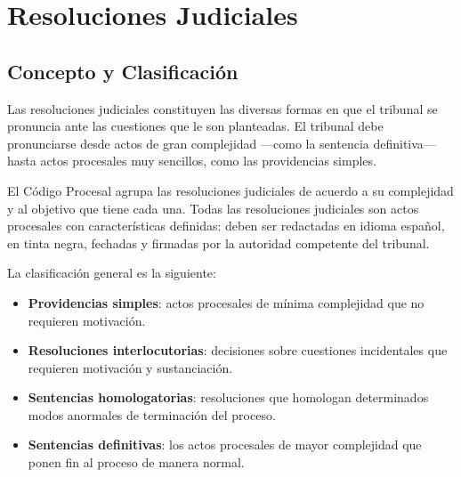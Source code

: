 \documentclass[12pt,oneside]{book}
\begin{document}

\tableofcontents

\newpage


\chapter{Resoluciones Judiciales}

\section{Concepto y Clasificación}

Las resoluciones judiciales constituyen las diversas formas en que el tribunal se pronuncia ante las cuestiones que le son planteadas. El tribunal debe pronunciarse desde actos de gran complejidad —como la sentencia definitiva— hasta actos procesales muy sencillos, como las providencias simples.

El Código Procesal agrupa las resoluciones judiciales de acuerdo a su complejidad y al objetivo que tiene cada una. Todas las resoluciones judiciales son actos procesales con características definidas: deben ser redactadas en idioma español, en tinta negra, fechadas y firmadas por la autoridad competente del tribunal.

La clasificación general es la siguiente:

\begin{itemize}
    \item \textbf{Providencias simples}: actos procesales de mínima complejidad que no requieren motivación.
    \item \textbf{Resoluciones interlocutorias}: decisiones sobre cuestiones incidentales que requieren motivación y sustanciación.
    \item \textbf{Sentencias homologatorias}: resoluciones que homologan determinados modos anormales de terminación del proceso.
    \item \textbf{Sentencias definitivas}: los actos procesales de mayor complejidad que ponen fin al proceso de manera normal.
\end{itemize}
\end{document}
